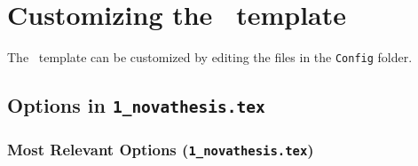 
\section{Customizing the \novathesistxt\ template}
\label{sec:package_options}

The \novathesistxt\ template can be customized by editing the files in the \texttt{Config} folder.

\newcommand{\classoption}[4]{\textbf{#1=OPT}\newline\emph{\small#2}&\textbf{#3}\newline{\small#4}\\}
\newcommand{\defaultopt}[1]{\mbox{$\Rightarrow$~\emph{Default: \texttt{#1}}}\newline}
\newcommand{\defaultit}[1][default]{($\Leftarrow$~\emph{#1})}


\subsection{Options in \texttt{1\_novathesis.tex}} %
\label{sub:_texttt_1__novathesis_tex}

\subsubsection{Most Relevant Options (\texttt{1\_novathesis.tex})} %
\label{ssub:most_relevant_options}

